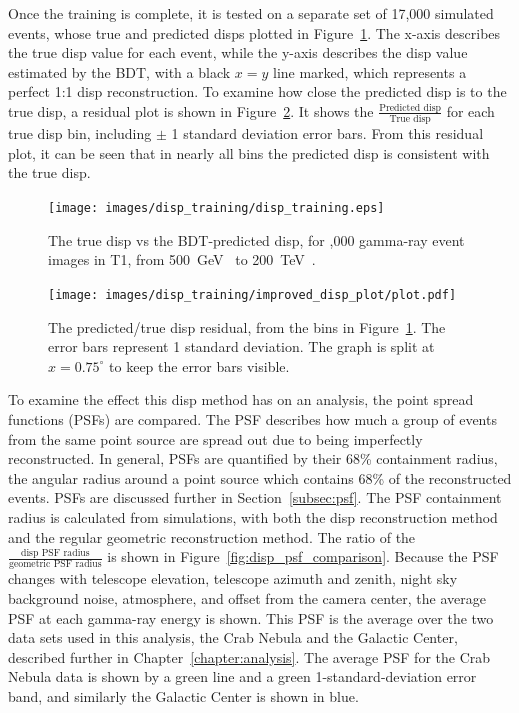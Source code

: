 Once the training is complete, it is tested on a separate set of 17,000 simulated events, whose true and predicted disps plotted in Figure~\ref{fig:disptraining}.
The x-axis describes the true disp value for each event, while the y-axis describes the disp value estimated by the BDT, with a black $x=y$ line marked, which represents a perfect 1:1 disp reconstruction.
To examine how close the predicted disp is to the true disp, a residual plot is shown in Figure~\ref{fig:dispresidual}.
It shows the $\frac{\textrm{Predicted disp}}{\textrm{True disp}}$ for each true disp bin, including $\pm$ 1 standard deviation error bars.
From this residual plot, it can be seen that in nearly all bins the predicted disp is consistent with the true disp.

\begin{figure}[b]
  \centering
  \texttt{[image: images/disp\_training/disp\_training.eps]}
  \caption[Disp BDT Training]{
    The true disp vs the BDT-predicted disp, for ,000 gamma-ray event images in T1, from \SI{500}{\GeV{}} to \SI{200}{\TeV{}}.
  }
  \label{fig:disptraining}
\end{figure}

\begin{figure}[t]
  \centering
  \texttt{[image: images/disp\_training/improved\_disp\_plot/plot.pdf]}
  \caption[Disp BDT Residual]{
    The predicted/true disp residual, from the bins in Figure~\ref{fig:disptraining}.
    The error bars represent 1 standard deviation.
    The graph is split at $x=0.75^{\circ}$ to keep the error bars visible.
  }
  \label{fig:dispresidual}
\end{figure}

To examine the effect this disp method has on an analysis, the point spread functions (PSFs) are compared.
The PSF describes how much a group of events from the same point source are spread out due to being imperfectly reconstructed.
In general, PSFs are quantified by their 68\% containment radius, the angular radius around a point source which contains 68\% of the reconstructed events.
PSFs are discussed further in Section~\ref{subsec:psf}.
The PSF containment radius is calculated from simulations, with both the disp reconstruction method and the regular geometric reconstruction method.
The ratio of the $\frac{\textrm{disp PSF radius}}{\textrm{geometric PSF radius}}$ is shown in Figure~\ref{fig:disp_psf_comparison}.
Because the PSF changes with telescope elevation, telescope azimuth and zenith, night sky background noise, atmosphere, and offset from the camera center, the average PSF at each gamma-ray energy is shown.
This PSF is the average over the two data sets used in this analysis, the Crab Nebula and the Galactic Center, described further in Chapter~\ref{chapter:analysis}.
The average PSF for the Crab Nebula data is shown by a green line and a green 1-standard-deviation error band, and similarly the Galactic Center is shown in blue.
    

